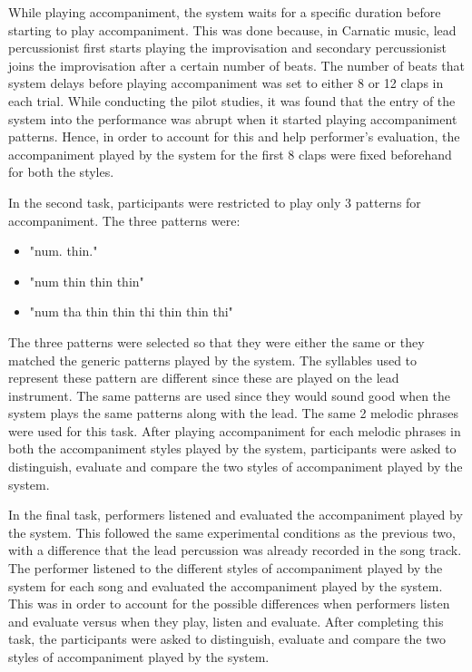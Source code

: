 While playing accompaniment, the system waits for a specific duration before starting to play accompaniment. This was done because, in Carnatic music, lead percussionist first starts playing the improvisation and secondary percussionist joins the improvisation after a certain number of beats. The number of beats that system delays before playing accompaniment was set to either 8 or 12 claps in each trial. While conducting the pilot studies, it was found that the entry of the system into the performance was abrupt when it started playing accompaniment patterns. Hence, in order to account for this and help performer's evaluation, the accompaniment played by the system for the first 8 claps were fixed beforehand for both the styles. 

In the second task, participants were restricted to play only 3 patterns for accompaniment. The three patterns were:

\begin{itemize}
\item "num. thin."
\item "num thin thin thin"
\item "num tha thin thin thi thin thin thi"
\end{itemize}

The three patterns were selected so that they were either the same or they matched the generic patterns played by the system. The syllables used to represent these pattern are different since these are played on the lead instrument. The same patterns are used since they would sound good when the system plays the same patterns along with the lead. The same 2 melodic phrases were used for this task. After playing accompaniment for each melodic phrases in both the accompaniment styles played by the system, participants were asked to distinguish, evaluate and compare the two styles of accompaniment played by the system. 

In the final task, performers listened and evaluated the accompaniment played by the system. This followed the same experimental conditions as the previous two, with a difference that the lead percussion was already recorded in the song track. The performer listened to the different styles of accompaniment played by the system for each song and evaluated the accompaniment played by the system. This was in order to account for the possible differences when performers listen and evaluate versus when they play, listen and evaluate. After completing this task, the participants were asked to distinguish, evaluate and compare the two styles of accompaniment played by the system. 







